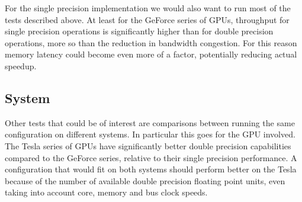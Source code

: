 For the single precision implementation we would also want to run most of the tests described above. At least for the
GeForce series of GPUs, throughput for single precision operations is significantly higher than for double precision
operations, more so than the reduction in bandwidth congestion. For this reason memory latency could become even more of
a factor, potentially reducing actual speedup.

\subsection{System}Other tests that could be of interest are comparisons between running the same configuration on different systems. In
particular this goes for the GPU involved. The Tesla series of GPUs have significantly better double precision capabilities
compared to the GeForce series, relative to their single precision performance. A configuration that would fit on both
systems should perform better on the Tesla because of the number of available double precision floating point units,
even taking into account core, memory and bus clock speeds.
